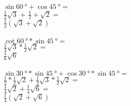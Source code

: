 \documentclass{article}
\begin{document}
 \\
$\sin \SI{60}{\degree} + \cos \SI{45}{\degree} =$ \\
$\frac{1}{2} \sqrt{3}$ + $\frac{1}{2} + \sqrt{2} =$ \\
$\frac{1}{2} (\sqrt{3} + \sqrt{2})$ \\
 \\
$\cot \SI{60}{\degree} * \sin \SI{45}{\degree} =$ \\
$\frac{1}{3} \sqrt{3} * \frac{1}{2} \sqrt{2} = $ \\
$\frac{1}{6} \sqrt{6}$ \\
 \\
$\sin \SI{30}{\degree} * \sin \SI{45}{\degree} + \cos \SI{30}{\degree} * \sin \SI{45}{\degree} =$ \\
$\frac{1}{2} * \frac{1}{2} \sqrt{2} + \frac{1}{2} \sqrt{3} * \frac{1}{2} \sqrt{2}=$ \\
$\frac{1}{4} \sqrt{2} + \frac{1}{4} \sqrt{6} =$ \\
$\frac{1}{4} (\sqrt{2} + \sqrt{6})$
\end{document}
